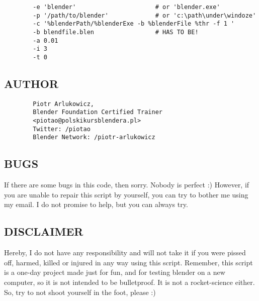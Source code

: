\documentclass{article}
\begin{document}
\begin{verbatim}
        -e 'blender'                      # or 'blender.exe'
        -p '/path/to/blender'             # or 'c:\path\under\windoze'
        -c '%blenderPath/%blenderExe -b %blenderFile %thr -f 1 '
        -b blendfile.blen                 # HAS TO BE!
        -a 0.01
        -i 3
        -t 0
\end{verbatim}
\subsection*{AUTHOR\label{AUTHOR}}
\begin{verbatim}
        Piotr Arlukowicz,
        Blender Foundation Certified Trainer
        <piotao@polskikursblendera.pl>
        Twitter: /piotao
        Blender Network: /piotr-arlukowicz
\end{verbatim}
\subsection*{BUGS\label{BUGS}}


If there are some bugs in this code, then sorry. Nobody is perfect :)
However, if you are unable to repair this script by yourself, you can try to
bother me using my email. I do not promise to help, but you can always try.

\subsection*{DISCLAIMER\label{DISCLAIMER}}


Hereby, I do not have any responsibility and will not take it if you were
pissed off, harmed, killed or injured in any way using this script. Remember,
this script is a one-day project made just for fun, and for testing blender
on a new computer, so it is not intended to be bulletproof. It is not a
rocket-science either. So, try to not shoot yourself in the foot, please :)

\printindex
\end{document}
